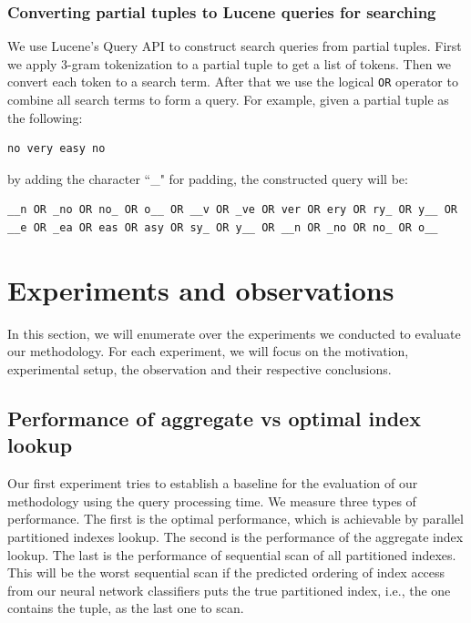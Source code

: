 \subsubsection{Converting partial tuples to Lucene queries for searching}
We use Lucene's Query API to construct search queries from partial tuples. First we apply 3-gram tokenization to a partial tuple to get a list of tokens. Then we convert each token to a search term. After that we use the logical \verb|OR| operator to combine all search terms to form a query.
For example, given a partial tuple as the following:
\begin{verbatim}
no very easy no
\end{verbatim}
by adding the character ``\_" for padding, the constructed query will be:
\begin{verbatim}
__n OR _no OR no_ OR o__ OR __v OR _ve OR ver OR ery OR ry_ OR y__ OR
__e OR _ea OR eas OR asy OR sy_ OR y__ OR __n OR _no OR no_ OR o__
\end{verbatim}

\section{Experiments and observations}

In this section, we will enumerate over the experiments we conducted to evaluate our methodology.  For each experiment, we will focus on the motivation, experimental setup, the observation and their respective conclusions.

\subsection{Performance of aggregate vs optimal index lookup}
\label{subsection:perf_baseline_expt}

Our first experiment tries to establish a baseline for the evaluation of our methodology using the query processing time. We measure three types of performance. The first is the optimal performance, which is achievable by parallel partitioned indexes lookup. The second is the performance of the aggregate index lookup. The last is the performance of sequential scan of all partitioned indexes. This will be the worst sequential scan if the predicted ordering of index access from our neural network classifiers puts the true partitioned index, i.e., the one contains the tuple, as the last one to scan.

